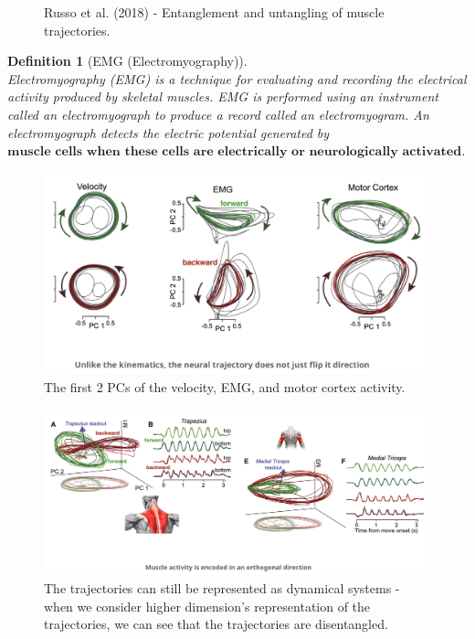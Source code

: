 \documentclass[11pt]{book} %
\newtheorem{definition}{Definition}[section]
\begin{document}
\begin{figure}[h]
\begin{subfigure}[b]{0.5\textwidth}
        \label{fig:untangling}
    \end{subfigure}
    \caption{Russo et al. (2018) - Entanglement and untangling of muscle trajectories.}
    \label{fig:entanglement_untangling}
\end{figure}


\begin{definition}[EMG (Electromyography)]\ \\
    Electromyography (EMG) is a technique for evaluating and recording the electrical activity produced by skeletal muscles. 
    EMG is performed using an instrument called an electromyograph to produce a record called an electromyogram. 
    An electromyograph detects the electric potential generated by $\textbf{muscle cells when these cells are electrically or neurologically activated}$.
\end{definition}

\begin{figure}[h]
    \centering
    \includegraphics[width=\textwidth]{./Figs/monkey4.jpeg}
    \caption{The first 2 PCs of the velocity, EMG, and motor cortex activity.}
    \label{fig:entanglement_untangling}
\end{figure}

\begin{figure}[h]
    \centering
    \includegraphics[width=\textwidth]{./Figs/monkey3.jpeg}
    \caption{The trajectories can still be represented as dynamical systems - when we consider higher dimension's representation of the trajectories,
    we can see that the trajectories are disentangled.}    
    \label{fig:entanglement_untangling}
\end{figure}
\end{document}
